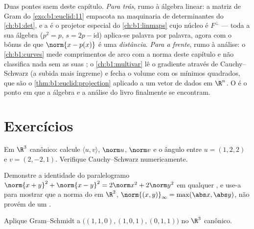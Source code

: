 \begin{remark}
\label{rem:b1:euclid:perspectives}
Duas pontes saem deste capítulo. \emph{Para trás}, rumo à álgebra
linear: a matriz de Gram do \cref{exo:b1:euclid:11} empacota  na
maquinaria de determinantes do \cref{ch:b1:det}, e a  é o
projetor especial do \cref{ch:b1:linmaps} cujo núcleo é $F^\perp$ --- toda a sua
álgebra ($p^2 = p$, $s = 2p -
\mathrm{id}$) aplica-se palavra por palavra, agora com
o bônus de que $\norm{x
- p(x)}$ é uma \emph{distância}. \emph{Para a frente},
rumo à análise: o \cref{ch:b1:curves} mede comprimentos de arco com a norma deste
capítulo e não classifica nada sem as suas ; o \cref{ch:b1:multivar} lê o
gradiente através de Cauchy--Schwarz (a subida mais íngreme) e fecha
o volume com os mínimos quadrados, que são o \cref{thm:b1:euclid:projection} aplicado a um
vetor de dados em $\R^n$. O  é o ponto em que a
álgebra e a análise do livro finalmente se encontram.
\end{remark}

\section{Exercícios}

\begin{exercise}[$\star$]\label{exo:b1:euclid:1}
Em $\R^3$ canônico: calcule $\langle u, v\rangle$, $\norm u$, $\norm v$ e o ângulo
entre $u = (1, 2, 2)$ e $v = (2, -2,
1)$. Verifique Cauchy--Schwarz numericamente.
\end{exercise}

\begin{exercise}[$\star$]\label{exo:b1:euclid:2}
Demonstre a identidade do paralelogramo $\norm{x+y}^2 + \norm{x-y}^2 =
2\norm x^2 + 2\norm y^2$ em qualquer , e use-a para mostrar que a norma do  em $\R^2$,
$\norm{(x,y)}_\infty = \max(\abs x,
\abs y)$, não provém de um .
\end{exercise}

\begin{exercise}[$\star$]\label{exo:b1:euclid:3}
Aplique Gram--Schmidt a $\bigl((1,1,0), (1,0,1), (0,1,1)\bigr)$ no $\R^3$ canônico.
\end{exercise}

